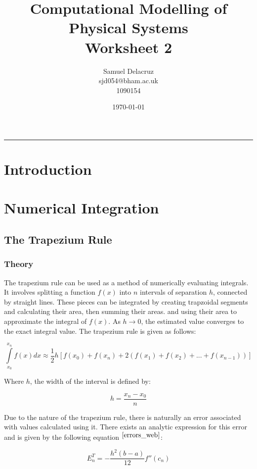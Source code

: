 \documentclass[pdf,color]{UoBnote}
\author{Samuel Delacruz\\
				sjd054@bham.ac.uk\\
				1090154}
\title{Computational Modelling of Physical Systems\\Worksheet 2}
\date{\today}
\begin{document}
\maketitle
\tableofcontents
\vspace{1cm}\hrule \vspace{1cm}

\section{Introduction}
\section{Numerical Integration}
	\subsection{The Trapezium Rule}
		\subsubsection{Theory}
			The trapezium rule can be used as a method of numerically evaluating integrals. It involves splitting a function $f(x)$ into $n$ intervals of separation $h$,
			connected by straight lines. These pieces can be integrated by creating trapzoidal segments and calculating their area, then summing their areas.
			and using their area to approximate the integral of $f(x)$. As $h \rightarrow 0$, the estimated value converges to the exact integral value. The trapezium rule is given as follows:
			
			\begin{equation} \label{eq:trapezium}
				\int\limits_{x_0}^{x_n} f(x) dx \approx \frac{1}{2}h\left[f(x_0) + f(x_n) + 2(f(x_1) + f(x_2) +...+ f(x_{n-1}))\right]
			\end{equation}
			
			Where $h$, the width of the interval is defined by:
			
			\begin{equation} \label{eq:h_def}
				h = \frac{x_n - x_0}{n}
			\end{equation}
			
			Due to the nature of the trapezium rule, there is naturally an error associated with values calculated using it.
			There exists an analytic expression for this error and is given by the following equation $^{\cite{errors_web}}$:
			
			
			\begin{equation} \label{eq:trap_err}
				E_n^T = -\frac{h^2\left(b-a\right)}{12}f''(c_n)
			\end{equation}
			
\end{document}
